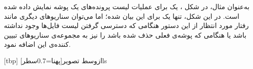 به‌عنوان مثال، در شکل ، یک  برای
 عملیات لیست پرونده‌های یک پوشه نمایش داده شده
است. در این شکل، تنها یک  برای این 
بیان شده؛ اما می‌توان سناریو‌های دیگری مانند رفتار مورد انتظار از این
دستور هنگامی که دسترسی گرفتن لیست فایل‌ها وجود نداشته باشد یا هنگامی که
پوشه‌ی فعلی حذف شده باشد را نیز به مجموعه‌ی سناریو‌های تبیین کننده‌ی این
 اضافه نمود.

[tbp]
‌ازوسط
‌تصویر[پهنا=0.7‌سطر]{ls}


